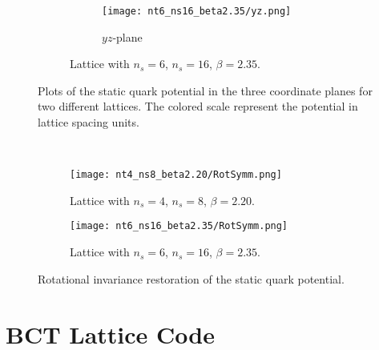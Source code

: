 \begin{figure}[!htbp]
\begin{subfigure}[b]{\textwidth}
\begin{subfigure}[b]{0.32\textwidth}
            \addtocounter{subfigure}{-1}
            \renewcommand\thesubfigure{\alph{subfigure}.3}
            \texttt{[image: nt6\_ns16\_beta2.35/yz.png]}
            \caption{$yz$-plane}
            \label{4F:PotentialPlanes616yz}
        \end{subfigure}
        \addtocounter{subfigure}{-1}
        \caption{Lattice with $n_s=6$, $n_s=16$, $\beta=2.35$.}
        \label{4F:PotentialPlanes616}
    \end{subfigure}
    \caption{Plots of the static quark potential in the three coordinate planes for two different lattices. The colored scale represent the potential in lattice spacing units.}
    \label{4F:PotentialPlanes}
\end{figure}\\
\begin{figure}[!htbp]
    \centering
    \begin{subfigure}[b]{0.48\textwidth}
        \texttt{[image: nt4\_ns8\_beta2.20/RotSymm.png]}
        \caption{Lattice with $n_s=4$, $n_s=8$, $\beta=2.20$.}
        \label{4F:PotentialRestorationLargea}
    \end{subfigure}
    \begin{subfigure}[b]{0.48\textwidth}
        \texttt{[image: nt6\_ns16\_beta2.35/RotSymm.png]}
        \caption{Lattice with $n_s=6$, $n_s=16$, $\beta=2.35$.}
        \label{4F:PotentialRestorationSmalla}
    \end{subfigure}
    \caption{Rotational invariance restoration of the static quark potential.}
    \label{4F:PotentialRestoration}
\end{figure}


\section{BCT Lattice Code}
